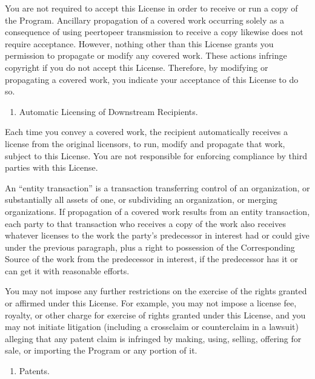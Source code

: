 \documentclass[letterpaper,10pt,english]{sphinxmanual}
\begin{document}
\sphinxAtStartPar
You are not required to accept this License in order to receive or run a copy of the Program. Ancillary propagation of a covered work occurring solely as a consequence of using peer\sphinxhyphen{}to\sphinxhyphen{}peer transmission to receive a copy likewise does not require acceptance. However, nothing other than this License grants you permission to propagate or modify any covered work. These actions infringe copyright if you do not accept this License. Therefore, by modifying or propagating a covered work, you indicate your acceptance of this License to do so.
\begin{enumerate}
%
\setcounter{enumi}{9}
\item {} 
\sphinxAtStartPar
Automatic Licensing of Downstream Recipients.

\end{enumerate}

\sphinxAtStartPar
Each time you convey a covered work, the recipient automatically receives a license from the original licensors, to run, modify and propagate that work, subject to this License. You are not responsible for enforcing compliance by third parties with this License.

\sphinxAtStartPar
An “entity transaction” is a transaction transferring control of an organization, or substantially all assets of one, or subdividing an organization, or merging organizations. If propagation of a covered work results from an entity transaction, each party to that transaction who receives a copy of the work also receives whatever licenses to the work the party’s predecessor in interest had or could give under the previous paragraph, plus a right to possession of the Corresponding Source of the work from the predecessor in interest, if the predecessor has it or can get it with reasonable efforts.

\sphinxAtStartPar
You may not impose any further restrictions on the exercise of the rights granted or affirmed under this License. For example, you may not impose a license fee, royalty, or other charge for exercise of rights granted under this License, and you may not initiate litigation (including a cross\sphinxhyphen{}claim or counterclaim in a lawsuit) alleging that any patent claim is infringed by making, using, selling, offering for sale, or importing the Program or any portion of it.
\begin{enumerate}
%
\setcounter{enumi}{10}
\item {} 
\sphinxAtStartPar
Patents.

\end{enumerate}
\end{document}
